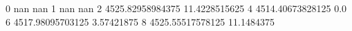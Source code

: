 0 nan nan
1 nan nan
2 4525.82958984375 11.4228515625
4 4514.40673828125 0.0
6 4517.98095703125 3.57421875
8 4525.55517578125 11.1484375
